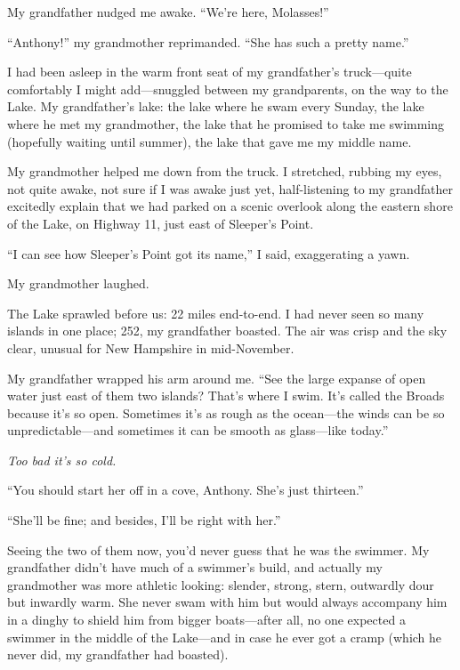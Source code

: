 \titlemark

My grandfather nudged me awake. ``We're here, Molasses!''

``Anthony!'' my grandmother reprimanded. ``She has such a pretty name.''

I had been asleep in the warm front seat of my grandfather's
truck---quite comfortably I might add---snuggled between my
grandparents, on the way to the Lake. My grandfather's lake: the lake
where he swam every Sunday, the lake where he met my grandmother, the
lake that he promised to take me swimming (hopefully waiting until
summer), the lake that gave me my middle name.

My grandmother helped me down from the truck. I stretched, rubbing my
eyes, not quite awake, not sure if I was awake just yet, half-listening
to my grandfather excitedly explain that we had parked on a scenic
overlook along the eastern shore of the Lake, on Highway 11, just east
of Sleeper's Point.

``I can see how Sleeper's Point got its name,'' I said, exaggerating a
yawn.

My grandmother laughed.

The Lake sprawled before us: 22 miles end-to-end. I had never seen so
many islands in one place; 252, my grandfather boasted. The air was
crisp and the sky clear, unusual for New Hampshire in mid-November.

My grandfather wrapped his arm around me. ``See the large expanse of
open water just east of them two islands? That's where I swim. It's
called the Broads because it's so open. Sometimes it's as rough as the
ocean---the winds can be so unpredictable---and sometimes it can be
smooth as glass---like today.''

\emph{Too bad it's so cold.}

``You should start her off in a cove, Anthony. She's just thirteen.''

``She'll be fine; and besides, I'll be right with her.''

Seeing the two of them now, you'd never guess that he was the swimmer.
My grandfather didn't have much of a swimmer's build, and actually my
grandmother was more athletic looking: slender, strong, stern, outwardly
dour but inwardly warm. She never swam with him but would always
accompany him in a dinghy to shield him from bigger boats---after all,
no one expected a swimmer in the middle of the Lake---and in case he
ever got a cramp (which he never did, my grandfather had boasted).


